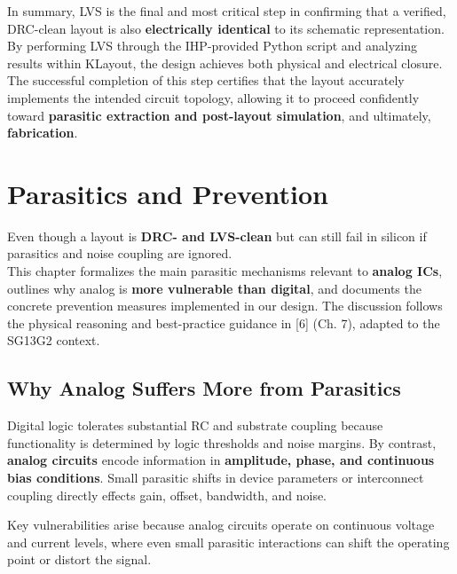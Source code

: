 \documentclass[
  11pt,
  a4paper,
  oneside]{scrbook}
\begin{document}
In summary, LVS is the final and most critical step in confirming that a
verified, DRC-clean layout is also \textbf{electrically identical} to
its schematic representation. By performing LVS through the IHP-provided
Python script and analyzing results within KLayout, the design achieves
both physical and electrical closure.\\
The successful completion of this step certifies that the layout
accurately implements the intended circuit topology, allowing it to
proceed confidently toward \textbf{parasitic extraction and post-layout
simulation}, and ultimately, \textbf{fabrication}.

\chapter{Parasitics and Prevention}\label{parasitics-and-prevention}

Even though a layout is \textbf{DRC- and LVS-clean} but can still fail
in silicon if parasitics and noise coupling are ignored.\\
This chapter formalizes the main parasitic mechanisms relevant to
\textbf{analog ICs}, outlines why analog is \textbf{more vulnerable than
digital}, and documents the concrete prevention measures implemented in
our design. The discussion follows the physical reasoning and
best-practice guidance in {[}6{]} (Ch. 7), adapted to the SG13G2
context.

\section{Why Analog Suffers More from
Parasitics}\label{why-analog-suffers-more-from-parasitics}

Digital logic tolerates substantial RC and substrate coupling because
functionality is determined by logic thresholds and noise margins. By
contrast, \textbf{analog circuits} encode information in
\textbf{amplitude, phase, and continuous bias conditions}. Small
parasitic shifts in device parameters or interconnect coupling directly
effects gain, offset, bandwidth, and noise.

Key vulnerabilities arise because analog circuits operate on continuous
voltage and current levels, where even small parasitic interactions can
shift the operating point or distort the signal.
\end{document}
